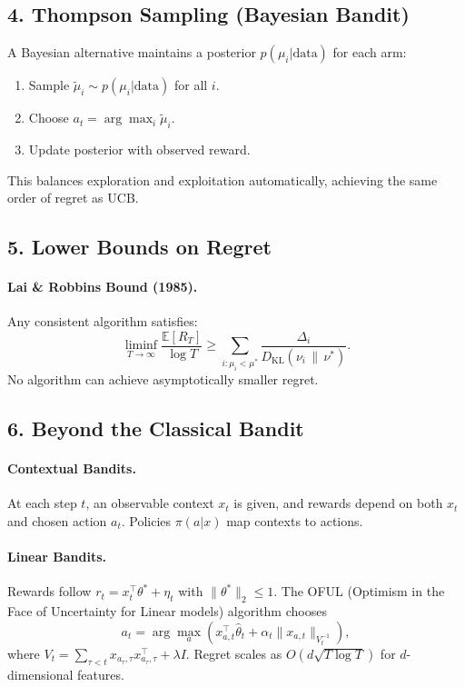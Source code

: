 \documentclass[12pt]{article}
\begin{document}
\subsection*{4. Thompson Sampling (Bayesian Bandit)}
A Bayesian alternative maintains a posterior $p(\mu_i|\text{data})$ for each arm:
\begin{enumerate}
		\item Sample $\tilde{\mu}_i \sim p(\mu_i|\text{data})$ for all $i$.
		\item Choose $a_t = \arg\max_i \tilde{\mu}_i$.
		\item Update posterior with observed reward.
\end{enumerate}
This balances exploration and exploitation automatically, achieving the same order of regret as UCB.

\subsection*{5. Lower Bounds on Regret}
\paragraph{Lai \& Robbins Bound (1985).}
Any consistent algorithm satisfies:
\[
		\liminf_{T \to \infty} \frac{\mathbb{E}[R_T]}{\log T}
		\ge \sum_{i:\mu_i < \mu^*} \frac{\Delta_i}{D_{\text{KL}}(\nu_i \,\|\, \nu^*)}.
\]
No algorithm can achieve asymptotically smaller regret.

\subsection*{6. Beyond the Classical Bandit}

\paragraph{Contextual Bandits.}
At each step $t$, an observable context $x_t$ is given, and rewards depend on both $x_t$
and chosen action $a_t$.
Policies $\pi(a|x)$ map contexts to actions.

\paragraph{Linear Bandits.}
Rewards follow $r_t = x_t^\top \theta^* + \eta_t$ with $\|\theta^*\|_2 \le 1$.
The OFUL (Optimism in the Face of Uncertainty for Linear models) algorithm chooses
\[
		a_t = \arg\max_a \left( x_{a,t}^\top \hat{\theta}_t + \alpha_t \|x_{a,t}\|_{V_t^{-1}} \right),
\]
where $V_t = \sum_{\tau<t} x_{a_\tau,\tau} x_{a_\tau,\tau}^\top + \lambda I$.
Regret scales as $O(d\sqrt{T \log T})$ for $d$-dimensional features.
\end{document}
